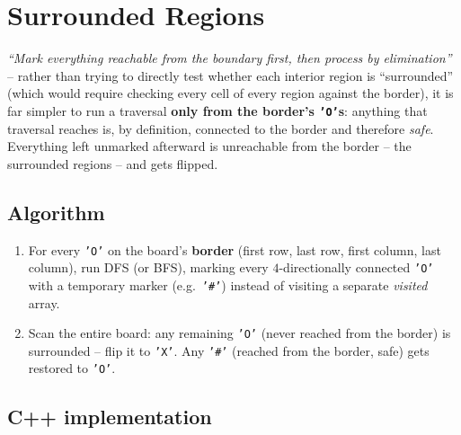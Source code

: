 \section{Surrounded Regions}
\label{sec:graph-surrounded-regions}


\begin{patternbox}
\emph{``Mark everything reachable from the boundary first, then
process by elimination''} -- rather than trying to directly test
whether each interior region is ``surrounded'' (which would require
checking every cell of every region against the border), it is far
simpler to run a traversal \textbf{only from the border's
\texttt{'O'}s}: anything that traversal reaches is, by definition,
connected to the border and therefore \emph{safe}. Everything left
unmarked afterward is unreachable from the border -- the surrounded
regions -- and gets flipped.
\end{patternbox}

\subsection*{Algorithm}

\begin{enumerate}
  \item For every \texttt{'O'} on the board's \textbf{border} (first
        row, last row, first column, last column), run DFS (or BFS),
        marking every $4$-directionally connected \texttt{'O'} with a
        temporary marker (e.g.\ \texttt{'\#'}) instead of visiting a
        separate \textit{visited} array.
  \item Scan the entire board: any remaining \texttt{'O'} (never
        reached from the border) is surrounded -- flip it to
        \texttt{'X'}. Any \texttt{'\#'} (reached from the border, safe)
        gets restored to \texttt{'O'}.
\end{enumerate}

\subsection*{C++ implementation}

